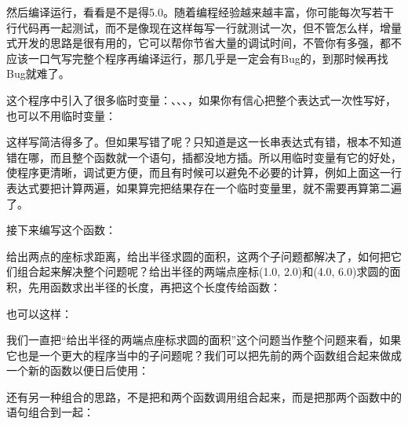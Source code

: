 

然后编译运行，看看是不是得5.\BookSplit{}0。随着编程经验越来越丰富，你可能每次写若干行代码再一起测试，而不是像现在这样每写一行就测试一次，但不管怎么样，增量式开发的思路是很有用的，它可以帮你节省大量的调试时间，不管你有多强，都不应该一口气写完整个程序再编译运行，那几乎是一定会有Bug的，到那时候再找Bug就难了。



这个程序中引入了很多临时变量：、、、，如果你有信心把整个表达式一次性写好，也可以不用临时变量：




这样写简洁得多了。但如果写错了呢？只知道是这一长串表达式有错，根本不知道错在哪，而且整个函数就一个语句，插都没地方插。所以用临时变量有它的好处，使程序更清晰，调试更方便，而且有时候可以避免不必要的计算，例如上面这一行表达式要把计算两遍，如果算完把结果存在一个临时变量里，就不需要再算第二遍了。



接下来编写这个函数：




给出两点的座标求距离，给出半径求圆的面积，这两个子问题都解决了，如何把它们组合起来解决整个问题呢？给出半径的两端点座标(1.\BookSplit{}0, 2.\BookSplit{}0)和(4.\BookSplit{}0, 6.\BookSplit{}0)求圆的面积，先用函数求出半径的长度，再把这个长度传给函数：




也可以这样：




我们一直把“给出半径的两端点座标求圆的面积”这个问题当作整个问题来看，如果它也是一个更大的程序当中的子问题呢？我们可以把先前的两个函数组合起来做成一个新的函数以便日后使用：




还有另一种组合的思路，不是把和两个函数调用组合起来，而是把那两个函数中的语句组合到一起：




